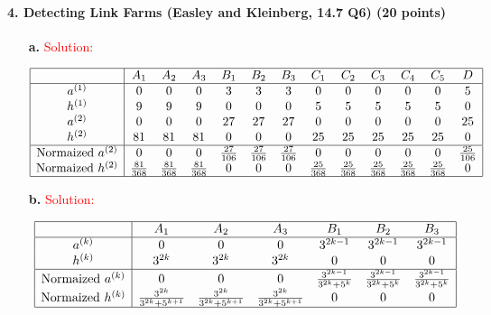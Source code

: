 \documentclass[11pt]{article} %
\begin{document}
 


















\paragraph{4. Detecting Link Farms (Easley and Kleinberg, 14.7 Q6) (20 points)}
 
\begin{itemize}
\item[\textbf{a. }]\textcolor{red}{Solution:}

$$\begin{array} {|c | c c c c c c c c c c c c|} \hline
 & \text{$A_1$} & \text{$A_2$} & \text{$A_3$} & \text{$B_1$} & \text{$B_2$} & \text{$B_3$} & \text{$C_1$}  & \text{$C_2$}  & \text{$C_3$} & \text{$C_4$} & \text{$C_5$} & \text{$D$}\\ \hline
a^{(1)} & 0 & 0 & 0 &  3 & 3 & 3 & 0 & 0 & 0 & 0 & 0 & 5\\ 
h^{(1)} & 9 & 9 &  9 & 0 & 0 & 0 & 5 & 5 & 5 & 5 & 5 & 0\\  
a^{(2)} & 0 & 0 & 0 & 27 & 27 & 27 & 0  & 0 & 0 & 0  & 0 & 25\\  
h^{(2)} & 81 & 81 & 81 &  0 & 0 & 0 & 25 & 25& 25  & 25& 25 & 0\\ \hline
\text{Normaized} \ a^{(2)} & 0 & 0 & 0 & \frac{27}{106} & \frac{27}{106} & \frac{27}{106} & 0  & 0 & 0 & 0  & 0 & \frac{25}{106}\\  
\text{Normaized} \  h^{(2)}  & \frac{81}{368} & \frac{81}{368} & \frac{81}{368} &  0 & 0 & 0 & \frac{25}{368} & \frac{25}{368}&\frac{25}{368}  & \frac{25}{368}& \frac{25}{368} & 0\\ \hline
\end{array}$$



\item[\textbf{b. }]\textcolor{red}{Solution:} 

$$\begin{array} {|c | c c c c c c |} \hline
 & \text{$A_1$} & \text{$A_2$} & \text{$A_3$} & \text{$B_1$} & \text{$B_2$} & \text{$B_3$} \\ \hline 
a^{(k)} & 0 & 0 & 0 & 3^{2k-1} & 3^{2k-1} & 3^{2k-1}  \\  
h^{(k)} & 3^{2k}& 3^{2k} & 3^{2k}&  0 & 0 & 0  \\ \hline
\text{Normaized} \ a^{(k)} & 0 & 0 & 0 & \frac{3^{2k-1}}{3^{2k}+5^k} & \frac{3^{2k-1}}{3^{2k}+5^k}  & \frac{3^{2k-1}}{3^{2k}+5^k}   \\  
\text{Normaized} \  h^{(k)}  & \frac{3^{2k}}{3^{2k}+5^{k+1}} & \frac{3^{2k}}{3^{2k}+5^{k+1}} & \frac{3^{2k}}{3^{2k}+5^{k+1}} &  0 & 0 & 0  \\ \hline
\end{array}$$


\end{itemize}
\end{document}
